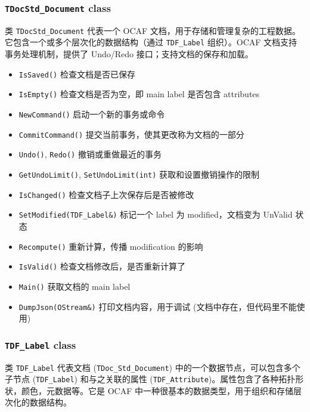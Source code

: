 \documentclass[11pt]{article}
\begin{document}
\subsubsection{\texttt{TDocStd\_Document} class}
\label{sec:org438a640}

类 \texttt{TDocStd\_Document} 代表一个 OCAF 文档，用于存储和管理复杂的工程数据。它包含一个或多个层次化的数据结构（通过 \texttt{TDF\_Label} 组织）。OCAF 文档支持事务处理机制，提供了 Undo/Redo 接口；支持文档的保存和加载。

\begin{itemize}
\item \texttt{IsSaved()} 检查文档是否已保存
\item \texttt{IsEmpty()} 检查文档是否为空，即 main label 是否包含 attributes
\item \texttt{NewCommand()} 启动一个新的事务或命令
\item \texttt{CommitCommand()} 提交当前事务，使其更改称为文档的一部分
\item \texttt{Undo()}, \texttt{Redo()} 撤销或重做最近的事务
\item \texttt{GetUndoLimit()}, \texttt{SetUndoLimit(int)} 获取和设置撤销操作的限制
\item \texttt{IsChanged()} 检查文档子上次保存后是否被修改
\item \texttt{SetModified(TDF\_Label\&)} 标记一个 label 为 modified，文档变为 UnValid 状态
\item \texttt{Recompute()} 重新计算，传播 modification 的影响
\item \texttt{IsValid()} 检查文档修改后，是否重新计算了
\item \texttt{Main()} 获取文档的 main label
\item \texttt{DumpJson(OStream\&)} 打印文档内容，用于调试 (文档中存在，但代码里不能使用)
\end{itemize}
\subsubsection{\texttt{TDF\_Label} class}
\label{sec:org10267a2}

类 \texttt{TDF\_Label} 代表文档 (\texttt{TDoc\_Std\_Document}) 中的一个数据节点，可以包含多个子节点 (\texttt{TDF\_Label}) 和与之关联的属性 (\texttt{TDF\_Attribute})。属性包含了各种拓扑形状，颜色，元数据等。它是 OCAF 中一种很基本的数据类型，用于组织和存储层次化的数据结构。
\end{document}
